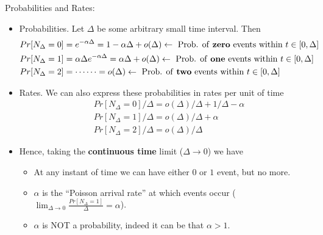 Probabilities and Rates: \begin{itemize}
    \item Probabilities. Let $\Delta$ be some arbitrary small time interval. Then \begin{align*}
               & Pr[N_\Delta = 0] = e^{-\alpha \Delta} = 1-\alpha\Delta + o(\Delta) \leftarrow \text{ Prob. of \textbf{zero} events within } t \in [0,\Delta]          \\
               & Pr[N_\Delta = 1] =\alpha\Delta e^{-\alpha \Delta} = \alpha\Delta + o(\Delta) \leftarrow \text{ Prob. of \textbf{one} events within } t \in [0,\Delta] \\
               & Pr[N_\Delta = 2] =\cdots \cdots = o(\Delta) \leftarrow \text{ Prob. of \textbf{two} events within } t \in [0,\Delta]
          \end{align*}
    \item Rates. We can also express these probabilities in rates per unit of time \begin{align*}
               & Pr[N_\Delta = 0]/\Delta = o(\Delta)/\Delta + 1/\Delta - \alpha \\
               & Pr[N_\Delta = 1]/\Delta = o(\Delta)/\Delta + \alpha            \\
               & Pr[N_\Delta = 2]/\Delta = o(\Delta)/\Delta
          \end{align*}
    \item Hence, taking the \textbf{continuous time} limit ($\Delta \to 0$) we have \begin{itemize}
              \item At any instant of time we can have either $0$ or $1$ event, but no more.
              \item $\alpha$ is the ``Poisson arrival rate'' at which events occur ($\lim_{\Delta \to 0} \frac{Pr[N_\Delta = 1]}{\Delta} = \alpha$).
              \item $\alpha$ is NOT a probability, indeed it can be that $\alpha > 1$.
          \end{itemize}
\end{itemize}

